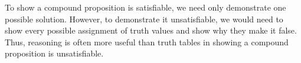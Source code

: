 To show a compound proposition is satisfiable, we need only demonstrate one possible solution.
However, to demonstrate it unsatisfiable, we would need to show every possible assignment of truth values and show why they make it false.
Thus, reasoning is often more useful than truth tables in showing a compound proposition is unsatisfiable.


